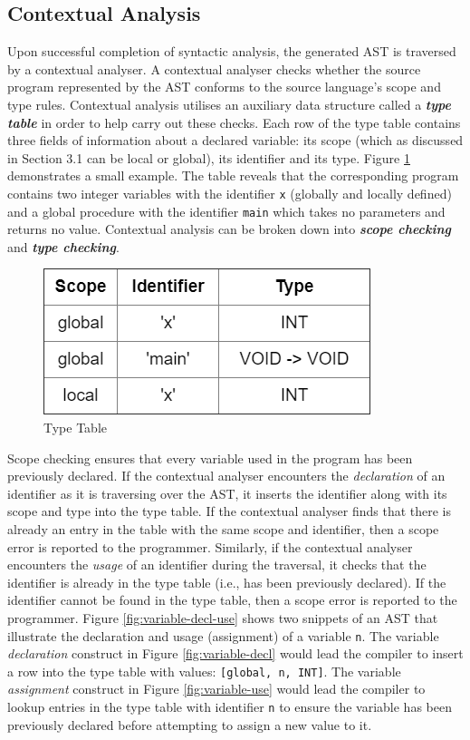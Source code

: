 \documentclass{l4proj}
\begin{document}
\subsection{Contextual Analysis}
Upon successful completion of syntactic analysis, the generated AST is traversed  by a contextual analyser. A contextual analyser checks whether the source program represented by the AST conforms to the source language's scope and type rules. Contextual analysis utilises an auxiliary data structure called a \textit{\textbf{type table}} in order to help carry out these checks. Each row of the type table contains three fields of information about a declared variable: its scope (which as discussed in Section 3.1 can be local or global), its identifier and its type. Figure \ref{fig:type-table} demonstrates a small example. The table reveals that the corresponding program contains two integer variables with the identifier \texttt{x} (globally and locally defined) and a global procedure with the identifier \texttt{main} which takes no parameters and returns no value. Contextual analysis can be broken down into \textit{\textbf{scope checking}} and \textit{\textbf{type checking}}.

\begin{figure}[h]
\centering
\includegraphics[scale=0.5]{images/type-table.png}
\caption{Type Table}
\label{fig:type-table}	
\end{figure}

Scope checking ensures that every variable used in the program has been previously declared. If the contextual analyser encounters the \textit{declaration} of an identifier as it is traversing over the AST, it inserts the identifier along with its scope and type into the type table. If the contextual analyser finds that there is already an entry in the table with the same scope and identifier, then a scope error is reported to the programmer. Similarly, if the contextual analyser encounters the \textit{usage} of an identifier during the traversal, it checks that the identifier is already in the type table (i.e., has been previously declared). If the identifier cannot be found in the type table, then a scope error is reported to the programmer. Figure \ref{fig:variable-decl-use} shows two snippets of an AST that illustrate the declaration and usage (assignment) of a variable \texttt{n}. The variable \textit{declaration} construct in Figure \ref{fig:variable-decl} would lead the compiler to insert a row into the type table with values: \texttt{[global, n, INT]}. The variable \textit{assignment} construct in Figure \ref{fig:variable-use} would lead the compiler to lookup entries in the type table with identifier \texttt{n} to ensure the variable has been previously declared before attempting to assign a new value to it.
\end{document}
